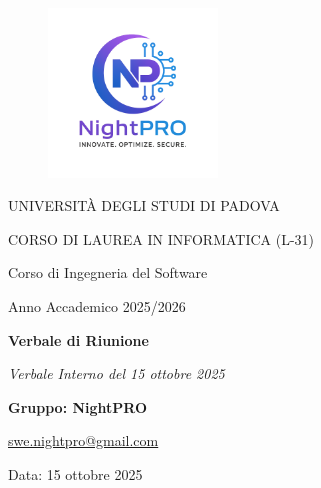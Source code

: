 \documentclass[a4paper, 11pt, oneside]{scrartcl} %
\begin{document}
\thispagestyle{empty}
\begin{titlepage}
    \centering
    
\begin{figure}
    \centering
    \includegraphics[width=0.4\textwidth]{logo.png}
\end{figure}

    \vfill
    
    {\small UNIVERSITÀ DEGLI STUDI DI PADOVA \par}
    {\small CORSO DI LAUREA IN INFORMATICA (L-31) \par}
    \vspace{0.5cm}
    {\large Corso di Ingegneria del Software \par}
    {\small Anno Accademico 2025/2026 \par}


    
    \vfill
    
    {\Huge \bfseries Verbale di Riunione \par}
    
    \vspace{1cm}
    
    {\Large \itshape Verbale Interno del 15 ottobre 2025 \par} 
    
    \vfill
    
    {\Large \bfseries Gruppo: NightPRO \par}
    \vspace{0.5cm}
    {\large \href{mailto:swe.nightpro@gmail.com}{swe.nightpro@gmail.com} \par}
    
    \vfill
    
    {\large Data: 15 ottobre 2025 \par}

\end{titlepage}
\end{document}
